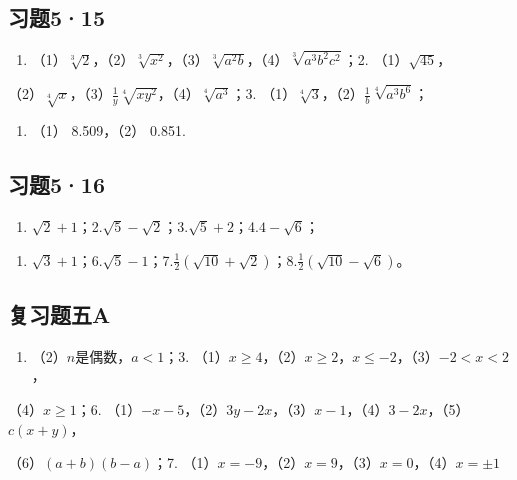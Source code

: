 \subsection{习题5·15}

\begin{enumerate}
\item
  （1）\(\sqrt[3]{2}\)，（2）\(\sqrt[3]{x^2}\)，（3）\(\sqrt[3]{a^2b}\)，（4）\(\sqrt[3]{a^3b^2c^2}\)；2.
  （1）\(\sqrt{45}\)，
\end{enumerate}

（2）\(\sqrt[4]{x}\)，（3）\(\frac{1}{y}\sqrt[4]{xy^2}\)，（4）\(\sqrt[4]{a^3}\)；3.
（1）\(\sqrt[4]{3}\)，（2）\(\frac{1}{b}\sqrt[4]{a^3b^6}\)；

\begin{enumerate}[start=4]
\item
  （1） 8.509，（2） 0.851.
\end{enumerate}

\subsection{习题5·16}

\begin{enumerate}[start=1]
\item
  \(\sqrt{2} + 1\)；2.\(\sqrt{5} - \sqrt{2}\)；3.\(\sqrt{5} + 2\)；4.\(4 - \sqrt{6}\)；
\end{enumerate}

\begin{enumerate}[start=5]
\item
  \(\sqrt{3} + 1\)；6.\(\sqrt{5} - 1\)；7.\(\frac{1}{2} (\sqrt{10} + \sqrt{2})\)；8.\(\frac{1}{2} (\sqrt{10} - \sqrt{6})\)。
\end{enumerate}

\subsection{复习题五A}

\begin{enumerate}[start=2]
\item
  （2）\(n\)是偶数，\(a < 1\)；3.
  （1）\(x \geqslant 4\)，（2）\(x \geqslant 2\)，\(x \leqslant -2\)，（3）\(-2 < x < 2\)，
\end{enumerate}

（4）\(x \geqslant 1\)；6.
（1）\(-x - 5\)，（2）\(3y - 2x\)，（3）\(x - 1\)，（4）\(3 - 2x\)，（5）\(c(x + y)\)，

（6）\((a + b)(b - a)\)；7.
（1）\(x = -9\)，（2）\(x = 9\)，（3）\(x = 0\)，（4）\(x = \pm 1\)

